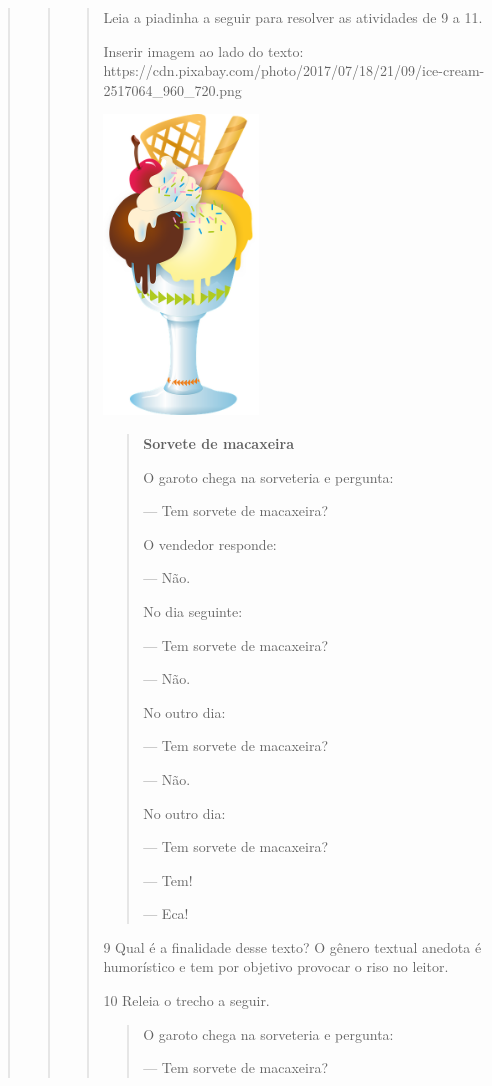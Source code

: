 \begin{boxlist}
{{\begin{quote}
\begin{quote}
\begin{quote}
{Leia a piadinha a seguir para resolver as atividades de 9 a 11.

Inserir imagem ao lado do texto:
https://cdn.pixabay.com/photo/2017/07/18/21/09/ice-cream-2517064\_960\_720.png

\includegraphics[width=1.61997in,height=3.13542in]{media/image20.png}

\begin{quote}
\textbf{Sorvete de macaxeira}

O garoto chega na sorveteria e pergunta:

--- Tem sorvete de macaxeira?

O vendedor responde:

--- Não.

No dia seguinte:

--- Tem sorvete de macaxeira?

--- Não.

No outro dia:

--- Tem sorvete de macaxeira?

--- Não.

No outro dia:

--- Tem sorvete de macaxeira?

--- Tem!

--- Eca!

\end{quote}

\num{9} Qual é a finalidade desse texto? O gênero
textual anedota é humorístico e tem por objetivo provocar o riso no
leitor.


\num{10} Releia o trecho a seguir.

\begin{quote}
O garoto chega na sorveteria e pergunta:

--- Tem sorvete de macaxeira?


\end{quote}}
\end{quote}
\end{quote}
\end{quote}}}
\end{boxlist}
